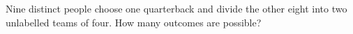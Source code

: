 Nine distinct people choose one quarterback and divide the other eight into two unlabelled teams of four. How many outcomes are possible?
